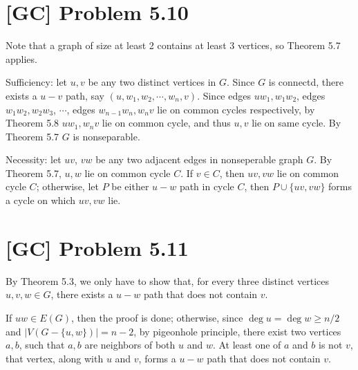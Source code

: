 \documentclass[a4paper,11pt,twocolumn]{article}
\begin{document}
  \section{[GC] Problem 5.10}
  Note that a graph of size at least 2 contains at least 3 vertices, so Theorem 5.7 applies. \par
  Sufficiency: let $u, v$ be any two distinct vertices in $G$. Since $G$ is connectd, there exists a $u-v$ path, say $(u, w_1, w_2, \cdots, w_n, v)$. Since edges $uw_1, w_1w_2$, edges $w_1w_2, w_2w_3$, $\cdots$, edges $w_{n-1}w_n, w_nv$ lie on common cycles respectively, by Theorem 5.8 $uw_1, w_nv$ lie on  common cycle, and thus $u, v$ lie on same cycle. By Theorem 5.7 $G$ is nonseparable. \par
  Necessity: let $uv$, $vw$ be any two adjacent edges in nonseperable graph $G$. By Theorem 5.7, $u, w$ lie on common cycle $C$. If $v \in C$, then $uv, vw$ lie on common cycle $C$; otherwise, let $P$ be either $u-w$ path in cycle $C$, then $P \cup \{uv, vw\}$ forms a cycle on which $uv, vw$ lie.

  \section{[GC] Problem 5.11}
  By Theorem 5.3, we only have to show that, for every three distinct vertices $u, v, w \in G$, there exists a $u-w$ path that does not contain $v$. \par
  If $uw \in E(G)$, then the proof is done; otherwise, since $ \deg u = \deg w \geq n/2$ and $|V(G - \{u, w\})| = n - 2$, by pigeonhole principle, there exist two vertices $a, b$, such that $a, b$ are neighbors of both $u$ and $w$. At least one of $a$ and $b$ is not $v$, that vertex, along with $u$ and $v$, forms a $u-w$ path that does not contain $v$.
\end{document}
